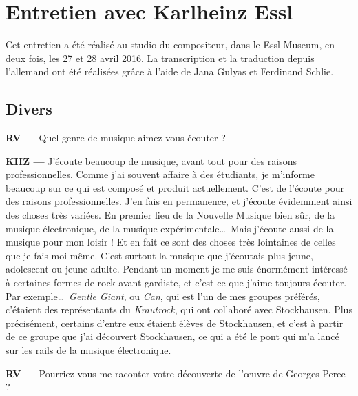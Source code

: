 \documentclass[a4paper,12pt]{article}
\begin{document}
\newpage
\section{Entretien avec Karlheinz Essl}

Cet entretien a été réalisé au studio du compositeur, dans le Essl Museum, en deux fois, les 27 et 28 avril 2016. La transcription et la traduction depuis l'allemand ont été réalisées grâce à l'aide de Jana Gulyas et Ferdinand Schlie.

\subsection{Divers}

\textbf{RV ---} Quel genre de musique aimez-vous écouter ?

\textbf{KHZ ---} J'écoute beaucoup de musique, avant tout pour des raisons professionnelles. Comme j'ai souvent affaire à des étudiants, je m'informe beaucoup sur ce qui est composé et produit actuellement. C'est de l'écoute pour des raisons professionnelles. J'en fais en permanence, et j'écoute évidemment ainsi des choses très variées. En premier lieu de la Nouvelle Musique bien sûr, de la musique électronique, de la musique expérimentale\dots~Mais j'écoute aussi de la musique pour mon loisir ! Et en fait ce sont des choses très lointaines de celles que je fais moi-même. C'est surtout la musique que j'écoutais plus jeune, adolescent ou jeune adulte. Pendant un moment je me suis énormément intéressé à certaines formes de rock avant-gardiste, et c'est ce que j'aime toujours écouter. Par exemple\dots~\emph{Gentle Giant}, ou \emph{Can}, qui est l'un de mes groupes préférés, c'étaient des représentants du \emph{Krautrock}, qui ont collaboré avec Stockhausen. Plus précisément, certains d'entre eux étaient élèves de Stockhausen, et c'est à partir de ce groupe que j'ai découvert Stockhausen, ce qui a été le pont qui m'a lancé sur les rails de la musique électronique.

\textbf{RV ---} Pourriez-vous me raconter votre découverte de l'œuvre de Georges Perec ?
\end{document}
